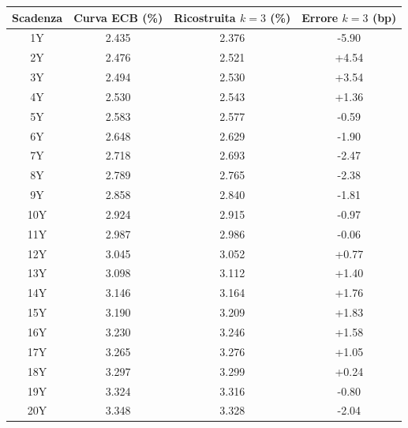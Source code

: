 \begin{center}
\renewcommand{\arraystretch}{1.15}
\begin{tabular}{c c c c}
\toprule
Scadenza & Curva ECB (\%) & Ricostruita $k=3$ (\%) & Errore $k=3$ (bp) \\
\midrule
1Y & 2.435 & 2.376 & -5.90 \\
2Y & 2.476 & 2.521 & +4.54 \\
3Y & 2.494 & 2.530 & +3.54 \\
4Y & 2.530 & 2.543 & +1.36 \\
5Y & 2.583 & 2.577 & -0.59 \\
6Y & 2.648 & 2.629 & -1.90 \\
7Y & 2.718 & 2.693 & -2.47 \\
8Y & 2.789 & 2.765 & -2.38 \\
9Y & 2.858 & 2.840 & -1.81 \\
10Y & 2.924 & 2.915 & -0.97 \\
11Y & 2.987 & 2.986 & -0.06 \\
12Y & 3.045 & 3.052 & +0.77 \\
13Y & 3.098 & 3.112 & +1.40 \\
14Y & 3.146 & 3.164 & +1.76 \\
15Y & 3.190 & 3.209 & +1.83 \\
16Y & 3.230 & 3.246 & +1.58 \\
17Y & 3.265 & 3.276 & +1.05 \\
18Y & 3.297 & 3.299 & +0.24 \\
19Y & 3.324 & 3.316 & -0.80 \\
20Y & 3.348 & 3.328 & -2.04 \\
\bottomrule
\end{tabular}
\end{center}
